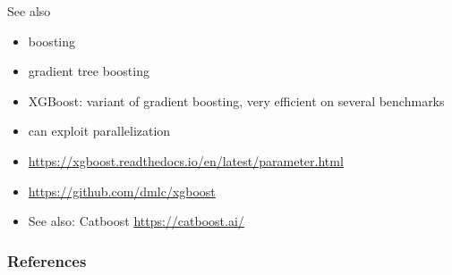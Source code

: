 \documentclass[usenames,dvipsnames]{beamer}
\begin{document}
\begin{frame}{See also}

    \begin{itemize}
	\item boosting
	\item gradient tree boosting
        \item XGBoost: variant of gradient boosting, very efficient on several
            benchmarks \cite{Chen2016} 
	\item can exploit parallelization
	 \item \url{https://xgboost.readthedocs.io/en/latest/parameter.html} 
        \item \url{https://github.com/dmlc/xgboost} 
        \item See also: Catboost \url{https://catboost.ai/} 
    \end{itemize}
\end{frame}

\begin{frame}[allowframebreaks]
\frametitle{References}

 
\end{frame}
\end{document}
